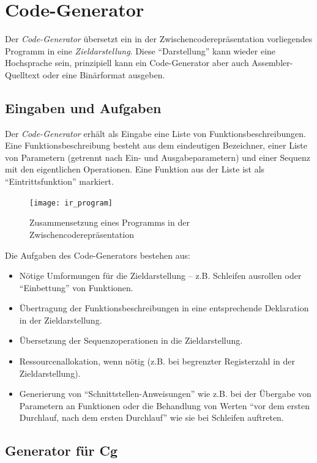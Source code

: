\documentclass[twoside,a4paper,fleqn,12pt]{book}
\begin{document}
\clearpage
\section{Code-Generator}

Der \emph{Code-Generator} übersetzt ein in der Zwischencoderepräsentation vorliegendes Programm in eine \emph{Zieldarstellung}.
Diese "`Darstellung"' kann wieder eine Hochsprache sein, prinzipiell kann ein Code-Generator aber auch Assembler-Quelltext oder eine
Binärformat ausgeben.

\subsection{Eingaben und Aufgaben}

Der \emph{Code-Generator} erhält als Eingabe eine Liste von Funktionsbeschreibungen.
Eine Funktionsbeschreibung besteht aus dem eindeutigen Bezeichner, einer Liste von Parametern (getrennt nach Ein- und Ausgabeparametern)
und einer Sequenz mit den eigentlichen Operationen. Eine Funktion aus der Liste ist als "`Eintrittsfunktion"' markiert.

\begin{figure}[h]
   \centering
  \texttt{[image: ir\_program]}
  \caption{Zusammensetzung eines Programms in der Zwischencoderepräsentation}
  \label{fig:ir_program}
\end{figure}

\newpage
Die Aufgaben des Code-Generators bestehen aus:
\begin{itemize}
\item Nötige Umformungen für die Zieldarstellung -- z.B. Schleifen ausrollen oder "`Einbettung"' von Funktionen.
\item Übertragung der Funktionsbeschreibungen in eine entsprechende Deklaration in der Zieldarstellung.
\item Übersetzung der Sequenzoperationen in die Zieldarstellung. 
\item Ressourcenallokation, wenn nötig (z.B. bei begrenzter Registerzahl in der Zieldarstellung).
\item Generierung von "`Schnittstellen-Anweisungen"' wie z.B. bei der Übergabe von Parametern an Funktionen
oder die Behandlung von Werten "`vor dem ersten Durchlauf, nach dem ersten Durchlauf"' wie sie bei Schleifen
auftreten.
\end{itemize}

\subsection{Generator für Cg}
\end{document}
